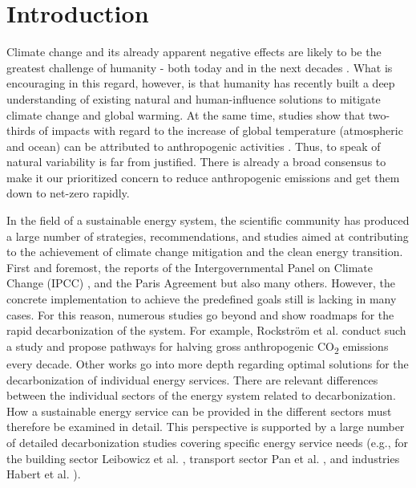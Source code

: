 \section{Introduction}
Climate change and its already apparent negative effects are likely to be the greatest challenge of humanity - both today and in the next decades \cite{karl2003modern}. What is encouraging in this regard, however, is that humanity has recently built a deep understanding of existing natural \cite{griscom2017natural} and human-influence solutions to mitigate climate change and global warming. At the same time, studies show that two-thirds of impacts with regard to the increase of global temperature (atmospheric and ocean) can be attributed to anthropogenic activities \cite{hansen2016assessing}. Thus, to speak of natural variability is far from justified. There is already a broad consensus to make it our prioritized concern to reduce anthropogenic emissions and get them down to net-zero rapidly.\newline

In the field of a sustainable energy system, the scientific community has produced a large number of strategies, recommendations, and studies aimed at contributing to the achievement of climate change mitigation and the clean energy transition. First and foremost, the reports of the Intergovernmental Panel on Climate Change (IPCC) \cite{edenhofer2011ipcc}, and the Paris Agreement \cite{agreement2015paris} but also many others. However, the concrete implementation to achieve the predefined goals still is lacking in many cases. For this reason, numerous studies go beyond and show roadmaps for the rapid decarbonization of the system. For example, Rockstr{\"o}m et al. \cite{rockstrom2017roadmap} conduct such a study and propose pathways for halving gross anthropogenic CO\textsubscript{2} emissions every decade. Other works go into more depth regarding optimal solutions for the decarbonization of individual energy services. There are relevant differences between the individual sectors of the energy system related to decarbonization. How a sustainable energy service can be provided in the different sectors must therefore be examined in detail. This perspective is supported by a large number of detailed decarbonization studies covering specific energy service needs (e.g., for the building sector Leibowicz et al. \cite{leibowicz2018optimal}, transport sector Pan et al. \cite{pan2018decarbonization}, and industries Habert et al. \cite{habert2020environmental}).\newline

